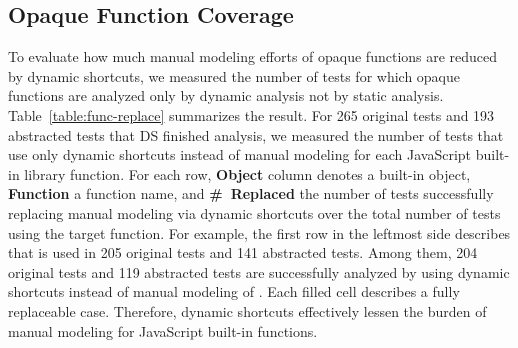 \subsection{Opaque Function Coverage}
To evaluate how much manual modeling efforts of opaque functions
are reduced by dynamic shortcuts, we measured the number of tests for which
opaque functions are analyzed only by dynamic analysis not by
static analysis.  Table~\ref{table:func-replace} summarizes the result.
For 265 original tests and 193 abstracted tests that DS finished analysis, we measured the
number of tests that use only dynamic shortcuts instead of manual modeling
for each JavaScript built-in library function.  For each row,
\textbf{Object} column denotes a built-in object, \textbf{Function} a function
name, and \textbf{\#~Replaced} the number of tests successfully replacing manual
modeling via dynamic shortcuts over the total number of tests using the target function.
For example, the first row in the leftmost side describes that  is used in
205 original tests and 141 abstracted tests.  Among them, 204 original
tests and 119 abstracted tests are successfully analyzed by using dynamic shortcuts
instead of manual modeling of .  Each filled cell describes
a fully replaceable case.  Therefore, dynamic
shortcuts effectively lessen the burden of manual modeling for JavaScript
built-in functions.  
